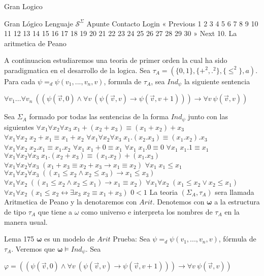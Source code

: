 Gran Logico

Gran Lógico
Lenguaje \(\mathcal{S}^{\Sigma }\)
Apunte
Contacto
Login
« Previous
1
2
3
4
5
6
7
8
9
10
11
12
13
14
15
16
17
18
19
20
21
22
23
24
25
26
27
28
29
30
» Next
10. La aritmetica de Peano

A continuacion estudiaremos una teoria de primer orden la cual ha sido paradigmatica en el desarrollo de la logica. Sea \(\tau _{A}=(\{0,1\},\{+^{2},.^{2}\},\{\leq ^{2}\},a)\). Para cada \(\psi =_{d}\psi (v_{1},...,v_{n},v)\), formula de \(\tau _{A}\), sea \(Ind_{\psi }\) la siguiente sentencia

\(\displaystyle \forall v_{1}...\forall v_{n}\ ((\psi (\vec{v},0)\wedge \forall v\ (\psi ( \vec{v},v)\rightarrow \psi (\vec{v},v+1)))\rightarrow \forall v\ \psi (\vec{v },v)) \)

Sea \(\Sigma _{A}\) formado por todas las sentencias de la forma \(Ind_{\psi }\) junto con las siguientes
\(\forall x_{1}\forall x_{2}\forall x_{3}\;x_{1}+(x_{2}+x_{3})\equiv (x_{1}+x_{2})+x_{3}\)
\(\forall x_{1}\forall x_{2}\;x_{2}+x_{1}\equiv x_{1}+x_{2}\)
\(\forall x_{1}\forall x_{2}\forall x_{3}\;x_{1}.(x_{2}.x_{3})\equiv (x_{1}.x_{2}).x_{3}\)
\(\forall x_{1}\forall x_{2}\;x_{2}.x_{1}\equiv x_{1}.x_{2}\)
\(\forall x_{1}\;x_{1}+0\equiv x_{1}\)
\(\forall x_{1}\;x_{1}.0\equiv 0\)
\(\forall x_{1}\;x_{1}.1\equiv x_{1}\)
\(\forall x_{1}\forall x_{2}\forall x_{3}\;x_{1}.(x_{2}+x_{3})\equiv (x_{1}.x_{2})+(x_{1}.x_{3})\)
\(\forall x_{1}\forall x_{2}\forall x_{3}\;(x_{1}+x_{3}\equiv x_{2}+x_{3}\rightarrow x_{1}\equiv x_{2})\)
\(\forall x_{1}\;x_{1}\leq x_{1}\)
\(\forall x_{1}\forall x_{2}\forall x_{3}\;((x_{1}\leq x_{2}\wedge x_{2}\leq x_{3})\rightarrow x_{1}\leq x_{3})\)
\(\forall x_{1}\forall x_{2}\;((x_{1}\leq x_{2}\wedge x_{2}\leq x_{1})\rightarrow x_{1}\equiv x_{2})\)
\(\forall x_{1}\forall x_{2}\;(x_{1}\leq x_{2}\vee x_{2}\leq x_{1})\)
\(\forall x_{1}\forall x_{2}\;(x_{1}\leq x_{2}\leftrightarrow \exists x_{3}\;x_{2}\equiv x_{1}+x_{3})\)
\(0< 1\)
La teoria \((\Sigma _{A},\tau _{A})\) sera llamada Aritmetica de Peano y la denotaremos con \(Arit\). Denotemos con \(\mathbf{ \omega }\) a la estructura de tipo \(\tau _{A}\) que tiene a \(\omega \) como universo e interpreta los nombres de \(\tau _{A}\) en la manera usual.

Lema 175 \(\mathbf{\omega }\) es un modelo de \(Arit\)
Prueba: Sea \(\psi =_{d}\psi (v_{1},...,v_{n},v)\), f\'{o}rmula de \(\tau _{A}\). Veremos que \(\mathbf{\omega }\vDash Ind_{\psi }\). Sea

\(\displaystyle \varphi =((\psi (\vec{v},0)\wedge \forall v\ (\psi (\vec{v},v)\rightarrow \psi (\vec{v},v+1)))\rightarrow \forall v\ \psi (\vec{v},v)) \)

